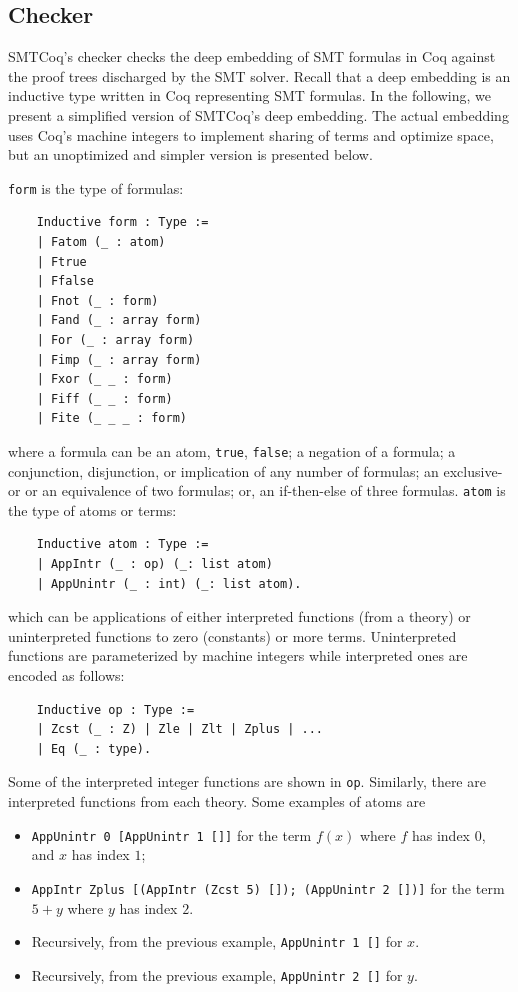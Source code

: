 \documentclass{article}
\begin{document}
	\subsection{Checker}
	\label{sec:checker}
	SMTCoq's checker checks the deep embedding
	of SMT formulas in Coq against the 
	proof trees discharged by the SMT solver.
	Recall that a deep embedding is an
	inductive type written in 
	Coq representing SMT formulas. 
	In the following, we present 
	a simplified version of SMTCoq's 
	deep embedding. The actual embedding 
	uses Coq's machine integers to 
	implement sharing of terms and 
	optimize space, but an unoptimized 
	and simpler version is presented 
	below. 
	
	\texttt{form} is the type of 
	formulas:
	\begin{verbatim}
	Inductive form : Type :=
	| Fatom (_ : atom)
	| Ftrue
	| Ffalse
	| Fnot (_ : form)
	| Fand (_ : array form)
	| For (_ : array form)
	| Fimp (_ : array form)
	| Fxor (_ _ : form)
	| Fiff (_ _ : form)
	| Fite (_ _ _ : form)
	\end{verbatim}
	where a formula can be an atom, 
	\texttt{true}, \texttt{false};
	a negation of a formula; a 
	conjunction, disjunction, or 
	implication of any number of
	formulas; an exclusive-or or
	an equivalence of two formulas; 
	or, an if-then-else of three formulas.
	\texttt{atom} is the type of atoms
	or terms:
	\begin{verbatim}
	Inductive atom : Type :=
	| AppIntr (_ : op) (_: list atom)
	| AppUnintr (_ : int) (_: list atom).	
	\end{verbatim} 
	which can be applications of 
	either interpreted functions 
	(from a theory) or uninterpreted
	functions to zero (constants) or more 
	terms. Uninterpreted functions 
	are parameterized by machine 
	integers while interpreted ones 
	are encoded as follows:
	\begin{verbatim}
	Inductive op : Type :=
	| Zcst (_ : Z) | Zle | Zlt | Zplus | ...
	| Eq (_ : type).
	\end{verbatim}
	Some of the interpreted integer 
	functions are shown in \texttt{op}.
	Similarly, there are interpreted 
	functions from each theory.
	Some examples of atoms are 
	\begin{itemize}
		\item \texttt{AppUnintr 0 [AppUnintr 
			1 []]} for the term $f(x)$ where 
		$f$ has index $0$, and $x$ has 
		index $1$; 
		\item \texttt{AppIntr Zplus [(AppIntr 
			(Zcst 5) []); (AppUnintr 2 [])]} 
		for the term $5 + y$ where $y$ 
		has index $2$.
		\item Recursively, from the previous example,
		\texttt{AppUnintr
			1 []} for $x$.
		\item Recursively, from the previous example,
		\texttt{AppUnintr 2 []} for $y$.
	\end{itemize}
\end{document}
